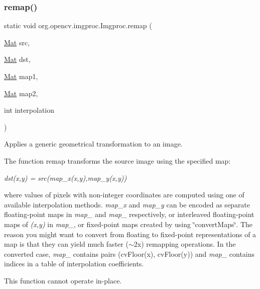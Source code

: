 \subsubsection{\texorpdfstring{remap()}{remap()}\hspace{0.1cm}{\footnotesize\ttfamily [2/2]}}
{\footnotesize\ttfamily static void org.\+opencv.\+imgproc.\+Imgproc.\+remap (\begin{DoxyParamCaption}\item[{\mbox{\hyperlink{classorg_1_1opencv_1_1core_1_1_mat}{Mat}}}]{src,  }\item[{\mbox{\hyperlink{classorg_1_1opencv_1_1core_1_1_mat}{Mat}}}]{dst,  }\item[{\mbox{\hyperlink{classorg_1_1opencv_1_1core_1_1_mat}{Mat}}}]{map1,  }\item[{\mbox{\hyperlink{classorg_1_1opencv_1_1core_1_1_mat}{Mat}}}]{map2,  }\item[{int}]{interpolation }\end{DoxyParamCaption})\hspace{0.3cm}{\ttfamily [static]}}

Applies a generic geometrical transformation to an image.

The function {\ttfamily remap} transforms the source image using the specified map\+:

{\itshape dst(x,y) = src(map\+\_\+x(x,y),map\+\_\+y(x,y))}

where values of pixels with non-\/integer coordinates are computed using one of available interpolation methods. {\itshape map\+\_\+x} and {\itshape map\+\_\+y} can be encoded as separate floating-\/point maps in {\itshape map\+\_} and {\itshape map\+\_} respectively, or interleaved floating-\/point maps of {\itshape (x,y)} in {\itshape map\+\_}, or fixed-\/point maps created by using \char`\"{}convert\+Maps\char`\"{}. The reason you might want to convert from floating to fixed-\/point representations of a map is that they can yield much faster ($\sim$2x) remapping operations. In the converted case, {\itshape map\+\_} contains pairs {\ttfamily (cv\+Floor(x), cv\+Floor(y))} and {\itshape map\+\_} contains indices in a table of interpolation coefficients.

This function cannot operate in-\/place.


